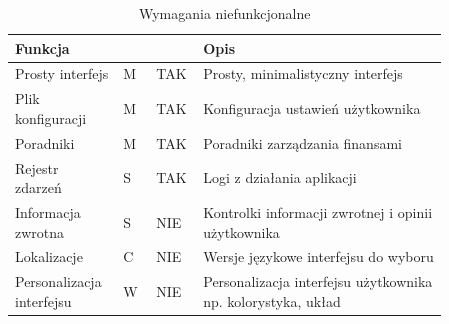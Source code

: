 \documentclass[a4paper,10pt, twoside]{report}
\newcommand{\customstyletable}[1]{\footnotesize{\textbf{#1}}}
\newcommand{\customstyletablecentered}[1]{\footnotesize\centering{\textbf{#1}}}
\begin{document}
\begin{large}
\begin{table}[H] %
    \caption{Wymagania niefunkcjonalne}
    \label{Wymagania niefunkcjonalne}
    \footnotesize
    \begin{tabular}{|p{0.2\linewidth}|p{0.07\linewidth}|p{0.07\linewidth}|p{0.52\linewidth}|}  %
    \hline                  %
    \customstyletable{Funkcja} & \customstyletablecentered{PRIO} & \customstyletablecentered{IMPL}& \customstyletable{Opis} \\
    \hline
    {Prosty interfejs} & {M} & {TAK} & {Prosty, minimalistyczny interfejs}\\
    \hline
    {Plik konfiguracji} & {M} & {TAK} & {Konfiguracja ustawień użytkownika}\\
    \hline
    {Poradniki} & {M} & {TAK} & {Poradniki zarządzania finansami}\\
    \hline
    {Rejestr zdarzeń} & {S} & {TAK} & {Logi z działania aplikacji}\\
    \hline
    {Informacja zwrotna} & {S} & {NIE} & {Kontrolki informacji zwrotnej i opinii użytkownika}\\
    \hline
    {Lokalizacje} & {C} & {NIE} & {Wersje językowe interfejsu do wyboru}\\
    \hline
    {Personalizacja interfejsu} & {W} & {NIE} & {Personalizacja interfejsu użytkownika np. kolorystyka, układ}\\
    \hline
    \end{tabular}
\end{table}


\end{large}
\end{document}

